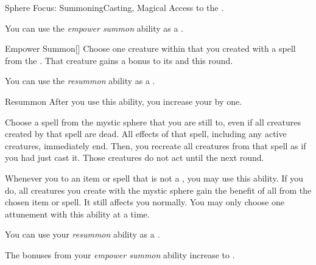     \begin{magicalfeat}{Sphere Focus: Summoning}{Casting, Magical}
        \featpre Access to the  .

         You can use the \textit{empower summon} ability as a .
        \begin{magicalactiveability}{Empower Summon}[]
            Choose one creature within \medrange that you created with a spell from the  .
            That creature gains a  bonus to its  and  this round.
        \end{magicalactiveability}

         You can use the \textit{resummon} ability as a .
        \begin{magicalactiveability}{Resummon}
            \rankline
            After you use this ability, you increase your  by one.

            Choose a spell from the  mystic sphere that you are still  to, even if all creatures created by that spell are dead.
            All effects of that spell, including any active creatures, immediately end.
            Then, you recreate all creatures from that spell as if you had just cast it.
            Those creatures do not act until the next round.
        \end{magicalactiveability}

         Whenever you  to an item or spell that is not a , you may use this ability.
        If you do, all creatures you create with the  mystic sphere gain the benefit of all  from the chosen item or spell.
        It still affects you normally.
        You may only choose one attunement with this ability at a time.

         You can use your \textit{resummon} ability as a .

         The bonuses from your \textit{empower summon} ability increase to .
    \end{magicalfeat}

